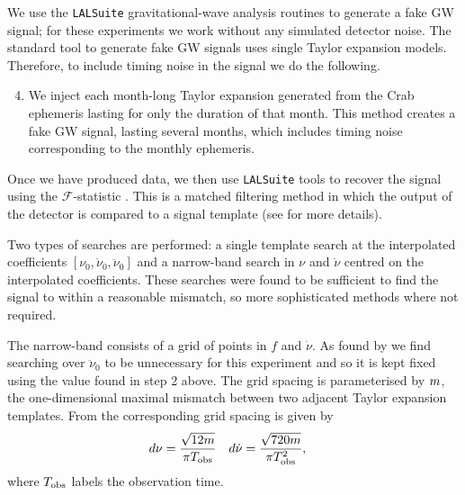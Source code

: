 \documentclass[../full_thesis/full_thesis.tex]{subfiles}
\begin{document}
We use the \verb+LALSuite+ \cite{lalsuite} gravitational-wave analysis routines
to generate a fake GW signal; for these experiments we work
without any simulated detector noise. The standard tool to generate fake GW
signals uses single Taylor expansion models. Therefore, to include timing noise
in the signal we do the following.

\begin{enumerate}
\setcounter{enumi}{3}

\item We inject each month-long Taylor expansion generated from the Crab ephemeris
lasting for only the duration of that month.
This
method creates a fake GW signal, lasting several months, which includes timing noise corresponding to the monthly
ephemeris.

\end{enumerate}

Once we have produced data, we then use \verb+LALSuite+ tools to recover the
signal using the $\mathcal{F}$-statistic \citep{Jaranowski1998}. This is a
matched filtering method in which the output of the detector is compared to a
signal template (see \citet{Prix2009} for more details).

Two types of searches are performed: a single
template search at the interpolated coefficients $[\nu_{0}, \dot{\nu}_{0},
\ddot{\nu}_{0}]$ and a narrow-band search in $\nu$ and $\dot{\nu}$ centred on the
interpolated coefficients. These searches were found to be sufficient
to find the signal to within a reasonable mismatch, so more sophisticated
methods where not required.

The narrow-band consists of a grid of points in
$f$ and $\dot{\nu}$. As found by \citet{ligo2008} we find searching over
$\ddot{\nu}_{0}$ to be unnecessary for this experiment and so it is kept fixed using
the value found in step 2 above.
 The grid spacing is parameterised
by $m$, the one-dimensional maximal mismatch between two adjacent Taylor
expansion templates. From
\citet{ligo2013_EAH} the corresponding grid spacing is given by
\begin{align}
    d\nu = \frac{\sqrt{12 m}}{\pi T_{\textrm{obs}}} &&&
    d\dot{\nu} = \frac{\sqrt{720 m}}{\pi T_{\textrm{obs}}^{2}},
\label{eqn: Grid spacing}
\end{align}
where $T_{\textrm{obs}}$ labels the observation time.
\end{document}
